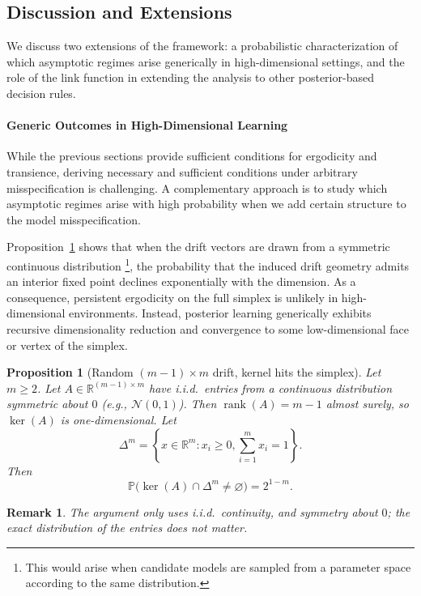 \documentclass[12pt]{article}
\newtheorem{proposition}{Proposition}
\newtheorem{remark}{Remark}
\begin{document}
\subsection{Discussion and Extensions}

We discuss two extensions of the framework: a probabilistic characterization of which asymptotic regimes arise generically in high-dimensional settings, and the role of the link function in extending the analysis to other posterior-based decision rules.

\paragraph{Generic Outcomes in High-Dimensional Learning}

While the previous sections provide sufficient conditions for ergodicity and transience, deriving necessary and sufficient conditions under arbitrary misspecification is challenging.
A complementary approach is to study which asymptotic regimes arise with high probability when we add certain structure to the model misspecification.

Proposition~\ref{prop:kernel_simplex} shows that when the drift vectors are drawn from a symmetric continuous distribution \footnote{This would arise when candidate models are sampled from a parameter space according to the same distribution.}, the probability that the induced drift geometry admits an interior fixed point declines exponentially with the dimension.
As a consequence, persistent ergodicity on the full simplex is unlikely in high-dimensional environments.
Instead, posterior learning generically exhibits recursive dimensionality reduction and convergence to some low-dimensional face or vertex of the simplex.

\begin{proposition}[Random $(m-1) \times m$ drift, kernel hits the simplex]
\label{prop:kernel_simplex}
Let $m \geq 2$. Let $A \in \mathbb{R}^{(m-1) \times m}$ have i.i.d.\ entries from a continuous distribution symmetric about $0$ (e.g., $\mathcal{N}(0,1)$). Then $\operatorname{rank}(A) = m-1$ almost surely, so $\ker(A)$ is one-dimensional. Let
\[
\Delta^m = \left\{x \in \mathbb{R}^m : x_i \geq 0, \sum_{i=1}^m x_i = 1\right\}.
\]
Then
\[
\mathbb{P}\big(\ker(A) \cap \Delta^m \neq \varnothing\big) = 2^{1-m}.
\]
\end{proposition}

\begin{remark}
    The argument only uses i.i.d.\ continuity, and symmetry about $0$; the exact distribution of the entries does not matter.
\end{remark}
\end{document}

